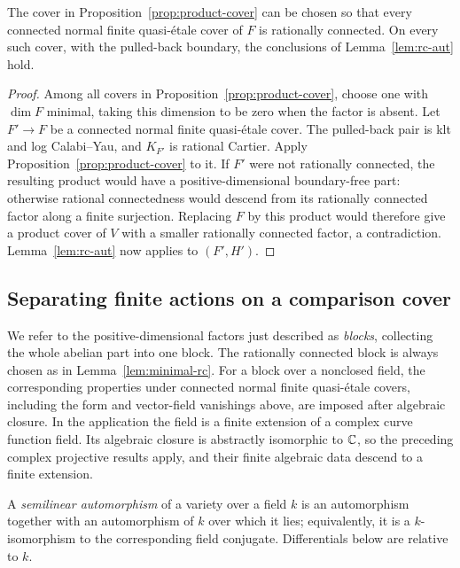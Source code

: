 \begin{lemma}\label{lem:minimal-rc}
The cover in Proposition~\ref{prop:product-cover} can be chosen so
that every connected normal finite quasi-\'etale cover of $F$ is
rationally connected.  On every such cover, with the pulled-back
boundary, the conclusions of Lemma~\ref{lem:rc-aut} hold.
\end{lemma}

\begin{proof}
Among all covers in Proposition~\ref{prop:product-cover}, choose
one with $\dim F$ minimal, taking this dimension to be zero when
the factor is absent.  Let $F'\to F$ be a connected normal finite
quasi-\'etale cover.  The pulled-back pair is klt and log
Calabi--Yau, and $K_{F'}$ is rational Cartier.  Apply
Proposition~\ref{prop:product-cover} to it.  If $F'$ were not
rationally connected, the resulting product would have a
positive-dimensional boundary-free part: otherwise rational
connectedness would descend from its rationally connected factor
along a finite surjection.  Replacing $F$ by this product would
therefore give a product cover of $V$ with a smaller rationally
connected factor, a contradiction.  Lemma~\ref{lem:rc-aut} now
applies to $(F',H')$.
\end{proof}

\subsection{Separating finite actions on a comparison cover}

We refer to the positive-dimensional factors just described as
\emph{blocks}, collecting the whole abelian part into one block.
The rationally connected block is always chosen as in
Lemma~\ref{lem:minimal-rc}.  For a block over a nonclosed field,
the corresponding properties under connected normal finite
quasi-\'etale covers, including the form and vector-field
vanishings above, are imposed after algebraic closure.  In the
application the field is a finite extension of a
complex curve function field.  Its algebraic closure is abstractly
isomorphic to $\mathbb C$, so the preceding complex projective results
apply, and their finite algebraic data descend to a finite extension.

A \emph{semilinear automorphism} of a variety over a field $k$ is an
automorphism together with an automorphism of $k$ over which it lies;
equivalently, it is a $k$-isomorphism to the corresponding field
conjugate.  Differentials below are relative to $k$.

